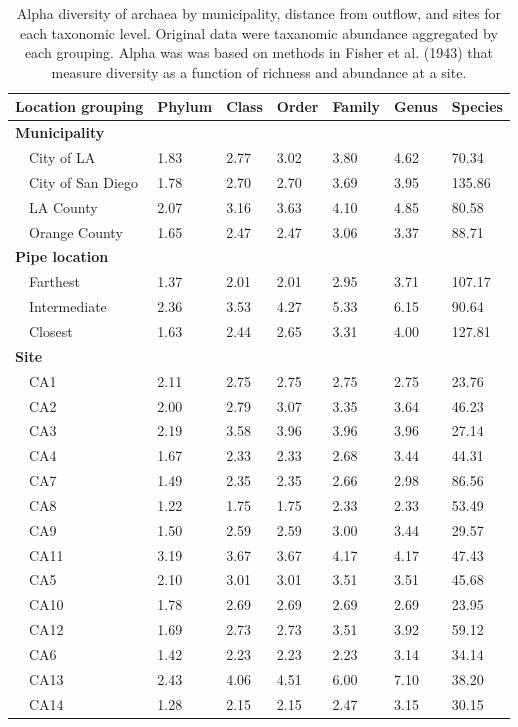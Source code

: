 \documentclass[letterpaper,12pt]{article}\usepackage[]{graphicx}\usepackage[]{color}
\begin{document}
\begin{table}[!tbp]
\caption{Alpha diversity of archaea by municipality, distance from outflow, and sites for each taxonomic level.  Original data were taxanomic abundance aggregated by each grouping.  Alpha was was based on methods in Fisher et al. (1943) that measure diversity as a function of richness and abundance at a site.\label{tab:alpha_arch}} 
\begin{center}
\begin{tabular}{lllllll}
\hline\hline
\multicolumn{1}{l}{Location grouping}&\multicolumn{1}{c}{Phylum}&\multicolumn{1}{c}{Class}&\multicolumn{1}{c}{Order}&\multicolumn{1}{c}{Family}&\multicolumn{1}{c}{Genus}&\multicolumn{1}{c}{Species}\tabularnewline
\hline
{\bfseries Municipality}&&&&&&\tabularnewline
~~City of LA&1.83&2.77&3.02&3.80&4.62& 70.34\tabularnewline
~~City of San Diego&1.78&2.70&2.70&3.69&3.95&135.86\tabularnewline
~~LA County&2.07&3.16&3.63&4.10&4.85& 80.58\tabularnewline
~~Orange County&1.65&2.47&2.47&3.06&3.37& 88.71\tabularnewline
\hline
{\bfseries Pipe location}&&&&&&\tabularnewline
~~Farthest&1.37&2.01&2.01&2.95&3.71&107.17\tabularnewline
~~Intermediate&2.36&3.53&4.27&5.33&6.15& 90.64\tabularnewline
~~Closest&1.63&2.44&2.65&3.31&4.00&127.81\tabularnewline
\hline
{\bfseries Site}&&&&&&\tabularnewline
~~CA1&2.11&2.75&2.75&2.75&2.75& 23.76\tabularnewline
~~CA2&2.00&2.79&3.07&3.35&3.64& 46.23\tabularnewline
~~CA3&2.19&3.58&3.96&3.96&3.96& 27.14\tabularnewline
~~CA4&1.67&2.33&2.33&2.68&3.44& 44.31\tabularnewline
~~CA7&1.49&2.35&2.35&2.66&2.98& 86.56\tabularnewline
~~CA8&1.22&1.75&1.75&2.33&2.33& 53.49\tabularnewline
~~CA9&1.50&2.59&2.59&3.00&3.44& 29.57\tabularnewline
~~CA11&3.19&3.67&3.67&4.17&4.17& 47.43\tabularnewline
~~CA5&2.10&3.01&3.01&3.51&3.51& 45.68\tabularnewline
~~CA10&1.78&2.69&2.69&2.69&2.69& 23.95\tabularnewline
~~CA12&1.69&2.73&2.73&3.51&3.92& 59.12\tabularnewline
~~CA6&1.42&2.23&2.23&2.23&3.14& 34.14\tabularnewline
~~CA13&2.43&4.06&4.51&6.00&7.10& 38.20\tabularnewline
~~CA14&1.28&2.15&2.15&2.47&3.15& 30.15\tabularnewline
\hline
\end{tabular}\end{center}
\end{table}
\end{document}

